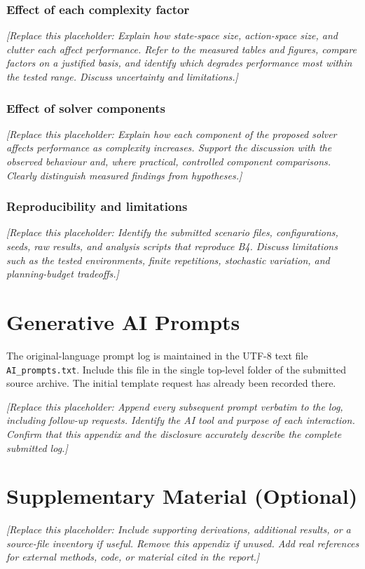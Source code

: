 \documentclass[11pt,a4paper]{article}
\newcommand{\placeholder}[1]{%
  \par\smallskip
  \noindent\textcolor{placeholderGray}{\textit{[Replace this placeholder: #1]}}
  \par\smallskip
}
\begin{document}

\subsubsection*{Effect of each complexity factor}
\placeholder{Explain how state-space size, action-space size, and clutter
each affect performance. Refer to the measured tables and figures, compare
factors on a justified basis, and identify which degrades performance most
within the tested range. Discuss uncertainty and limitations.}

\subsubsection*{Effect of solver components}
\placeholder{Explain how each component of the proposed solver affects
performance as complexity increases. Support the discussion with the
observed behaviour and, where practical, controlled component comparisons.
Clearly distinguish measured findings from hypotheses.}

\subsubsection*{Reproducibility and limitations}
\placeholder{Identify the submitted scenario files, configurations, seeds,
raw results, and analysis scripts that reproduce B4. Discuss limitations
such as the tested environments, finite repetitions, stochastic variation,
and planning-budget tradeoffs.}

\clearpage
\appendix
\section{Generative AI Prompts}
\label{app:ai-prompts}
The original-language prompt log is maintained in the UTF-8 text file
\texttt{AI\_prompts.txt}. Include this file in the single top-level folder of
the submitted source archive. The initial template request has already been
recorded there.

\placeholder{Append every subsequent prompt verbatim to the log, including
follow-up requests. Identify the AI tool and purpose of each interaction.
Confirm that this appendix and the disclosure accurately describe the
complete submitted log.}

\section{Supplementary Material (Optional)}
\placeholder{Include supporting derivations, additional results, or a
source-file inventory if useful. Remove this appendix if unused. Add real
references for external methods, code, or material cited in the report.}
\end{document}
